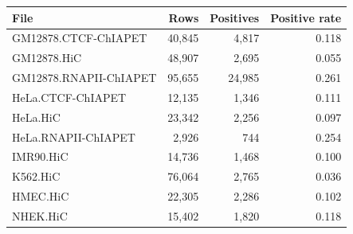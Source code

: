 \begin{tabular}{lrrr}
\toprule
File & Rows & Positives & Positive rate \\
\midrule
GM12878.CTCF-ChIAPET & 40,845 & 4,817 & 0.118 \\
GM12878.HiC & 48,907 & 2,695 & 0.055 \\
GM12878.RNAPII-ChIAPET & 95,655 & 24,985 & 0.261 \\
HeLa.CTCF-ChIAPET & 12,135 & 1,346 & 0.111 \\
HeLa.HiC & 23,342 & 2,256 & 0.097 \\
HeLa.RNAPII-ChIAPET & 2,926 & 744 & 0.254 \\
IMR90.HiC & 14,736 & 1,468 & 0.100 \\
K562.HiC & 76,064 & 2,765 & 0.036 \\
HMEC.HiC & 22,305 & 2,286 & 0.102 \\
NHEK.HiC & 15,402 & 1,820 & 0.118 \\
\bottomrule
\end{tabular}
